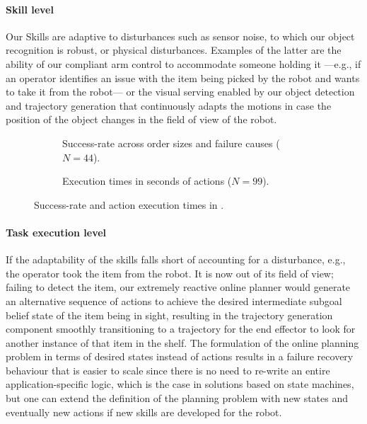 \paragraph{Skill level} Our Skills are adaptive to disturbances such as sensor noise, to which our object recognition is robust, or physical disturbances. Examples of the latter are the ability of our compliant arm control to accommodate someone holding it ---e.g., if an operator identifies an issue with the item being picked by the robot and wants to take it from the robot--- or the visual serving enabled by our object detection and trajectory generation that continuously adapts the motions in case the position of the object changes in the field of view of the robot.
\begin{figure}[t]
\begin{subfigure}[b]{0.5\linewidth}
    \centering
    
    \caption{Success-rate across order sizes and failure causes ($N=44$).}
    \label{fig:success_zandam}
  \end{subfigure}
\begin{subfigure}[b]{0.5\linewidth}
    \centering%
     
    \caption{Execution times in seconds of actions ($N=99$).}
    \label{fig:timings_real}
  \end{subfigure}
  \caption{Success-rate and action execution times in \realsupermarket.}
\end{figure}
\paragraph{Task execution level}
If the adaptability of the skills falls short of accounting for a disturbance, e.g., the operator took the item from the robot. It is now out of its field of view; failing to detect the item, our extremely reactive online planner would generate an alternative sequence of actions to achieve the desired intermediate subgoal belief state of the item being in sight, resulting in the trajectory generation component smoothly transitioning to a trajectory for the end effector to look for another instance of that item in the shelf.
The formulation of the online planning problem in terms of desired states instead of actions results in a failure recovery behaviour that is easier to scale since there is no need to re-write an entire application-specific logic, which is the case in solutions based on state machines, but one can extend the definition of the planning problem with new states and eventually new actions if new skills are developed for the robot.

